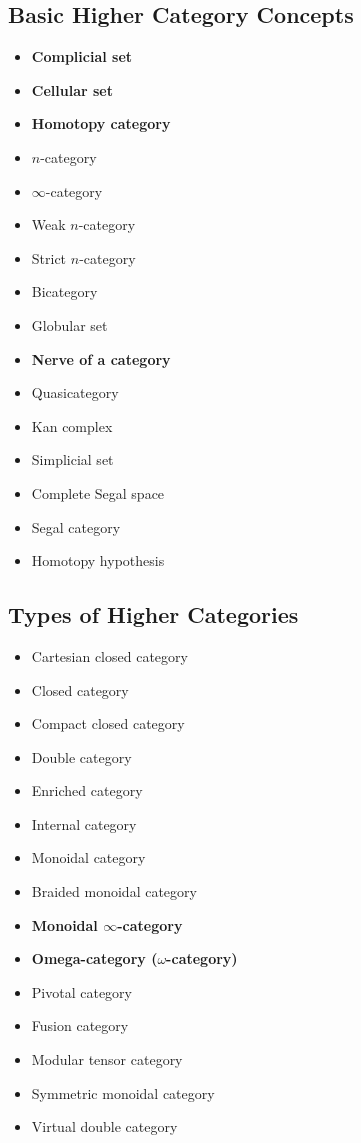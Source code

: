 \subsection{Basic Higher Category Concepts}

\begin{itemize}
\item \textbf{Complicial set}
\item \textbf{Cellular set}
\item \textbf{Homotopy category}
\item $n$-category
\item $\infty$-category
\item Weak $n$-category
\item Strict $n$-category
\item Bicategory
\item Globular set
\item \textbf{Nerve of a category}
\item Quasicategory
\item Kan complex
\item Simplicial set
\item Complete Segal space
\item Segal category
\item Homotopy hypothesis
\end{itemize}

\subsection{Types of Higher Categories}

\begin{itemize}
\item Cartesian closed category
\item Closed category
\item Compact closed category
\item Double category
\item Enriched category
\item Internal category
\item Monoidal category
\item Braided monoidal category
\item \textbf{Monoidal $\infty$-category}
\item \textbf{Omega-category ($\omega$-category)}
\item Pivotal category
\item Fusion category
\item Modular tensor category
\item Symmetric monoidal category
\item Virtual double category
\end{itemize}

